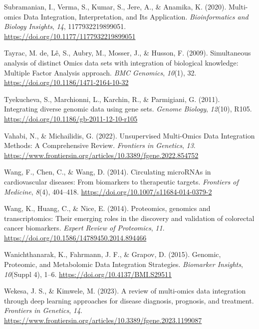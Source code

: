 \documentclass[a4paper, nobind]{templates/ociamthesis}
\newlength{\cslhangindent}
\newenvironment{CSLReferences}[2] %
 {%
  \setlength{\parindent}{0pt}
  \ifodd #1
  \let\oldpar\par
  \def\par{\hangindent=\cslhangindent\oldpar}
  \fi
  \setlength{\parskip}{1mm}
  \setlength{\baselineskip}{6mm}
 }%
 {}
\begin{document}
\begin{CSLReferences}{1}{0}
\leavevmode{}%
Subramanian, I., Verma, S., Kumar, S., Jere, A., \& Anamika, K. (2020). Multi-omics {Data} {Integration}, {Interpretation}, and {Its} {Application}. \emph{Bioinformatics and Biology Insights}, \emph{14}, 1177932219899051. \url{https://doi.org/10.1177/1177932219899051}

\leavevmode{}%
Tayrac, M. de, Lê, S., Aubry, M., Mosser, J., \& Husson, F. (2009). Simultaneous analysis of distinct {Omics} data sets with integration of biological knowledge: {Multiple} {Factor} {Analysis} approach. \emph{BMC Genomics}, \emph{10}(1), 32. \url{https://doi.org/10.1186/1471-2164-10-32}

\leavevmode{}%
Tyekucheva, S., Marchionni, L., Karchin, R., \& Parmigiani, G. (2011). Integrating diverse genomic data using gene sets. \emph{Genome Biology}, \emph{12}(10), R105. \url{https://doi.org/10.1186/gb-2011-12-10-r105}

\leavevmode{}%
Vahabi, N., \& Michailidis, G. (2022). Unsupervised {Multi}-{Omics} {Data} {Integration} {Methods}: {A} {Comprehensive} {Review}. \emph{Frontiers in Genetics}, \emph{13}. \url{https://www.frontiersin.org/articles/10.3389/fgene.2022.854752}

\leavevmode{}%
Wang, F., Chen, C., \& Wang, D. (2014). Circulating {microRNAs} in cardiovascular diseases: From biomarkers to therapeutic targets. \emph{Frontiers of Medicine}, \emph{8}(4), 404--418. \url{https://doi.org/10.1007/s11684-014-0379-2}

\leavevmode{}%
Wang, K., Huang, C., \& Nice, E. (2014). Proteomics, genomics and transcriptomics: {Their} emerging roles in the discovery and validation of colorectal cancer biomarkers. \emph{Expert Review of Proteomics}, \emph{11}. \url{https://doi.org/10.1586/14789450.2014.894466}

\leavevmode{}%
Wanichthanarak, K., Fahrmann, J. F., \& Grapov, D. (2015). Genomic, {Proteomic}, and {Metabolomic} {Data} {Integration} {Strategies}. \emph{Biomarker Insights}, \emph{10}(Suppl 4), 1--6. \url{https://doi.org/10.4137/BMI.S29511}

\leavevmode{}%
Wekesa, J. S., \& Kimwele, M. (2023). A review of multi-omics data integration through deep learning approaches for disease diagnosis, prognosis, and treatment. \emph{Frontiers in Genetics}, \emph{14}. \url{https://www.frontiersin.org/articles/10.3389/fgene.2023.1199087}


\end{CSLReferences}
\end{document}
